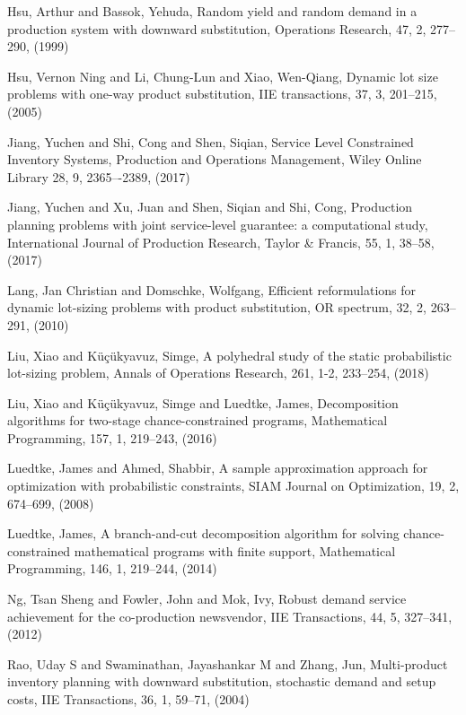 \documentclass[10pt]{article}
\begin{document}
\begin{thebibliography}{99}
Hsu, Arthur and Bassok, Yehuda, Random yield and random demand in a production system with downward substitution, Operations Research, 47, 2, 277--290,
  (1999)
  
Hsu, Vernon Ning and Li, Chung-Lun and Xiao, Wen-Qiang, Dynamic lot size problems with one-way product substitution, IIE transactions, 37, 3, 201--215, (2005)


 Jiang, Yuchen and Shi, Cong and Shen, Siqian, Service Level Constrained Inventory Systems, Production and Operations Management, Wiley Online Library 28, 9, 2365–-2389,
 (2017)
 
 Jiang, Yuchen and Xu, Juan and Shen, Siqian and Shi, Cong, Production planning problems with joint service-level guarantee: a computational study, International Journal of Production Research, Taylor \& Francis, 55, 1, 38--58,
 (2017)
 
 Lang, Jan Christian and Domschke, Wolfgang, Efficient reformulations for dynamic lot-sizing problems with product substitution, OR spectrum,
32, 2, 263--291, (2010)

Liu, Xiao and K{\"u}{\c{c}}{\"u}kyavuz, Simge, A polyhedral study of the static probabilistic lot-sizing problem, Annals of Operations Research, 261, 1-2,
233--254, (2018)

Liu, Xiao and K{\"u}{\c{c}}{\"u}kyavuz, Simge and Luedtke, James, 
Decomposition algorithms for two-stage chance-constrained programs, Mathematical Programming, 157,
  1, 219--243, (2016)
 

Luedtke, James and Ahmed, Shabbir, A sample approximation approach for optimization with probabilistic constraints, 
SIAM Journal on Optimization, 19,
2, 674--699, (2008)


  Luedtke, James, A branch-and-cut decomposition algorithm for solving chance-constrained mathematical programs with finite support,
  Mathematical Programming, 146, 1, 219--244,
 (2014)

Ng, Tsan Sheng and Fowler, John and Mok, Ivy, Robust demand service achievement for the co-production newsvendor, IIE Transactions,
  44,
  5,
 327--341,
  (2012)
  
 Rao, Uday S and Swaminathan, Jayashankar M and Zhang, Jun,
 Multi-product inventory planning with downward substitution, stochastic demand and setup costs,
 IIE Transactions, 36, 1, 59--71, (2004)
 

\end{thebibliography}
\end{document}
